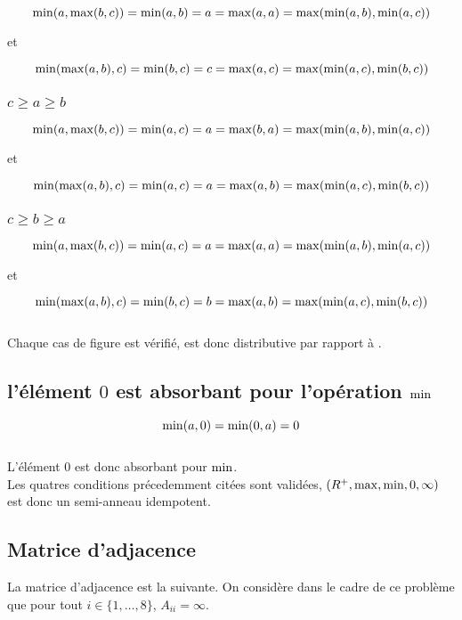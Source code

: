 \documentclass{article}
\begin{document}
$$\operatorname{min}(a, \operatorname{max}(b, c)) = \operatorname{min}(a, b) = a = \operatorname{max}(a,a) = \operatorname{max}(\operatorname{min}(a, b),\operatorname{min}(a,c))$$
\begin{center}et\end{center}
$$\operatorname{min}(\operatorname{max}(a,b),c) = \operatorname{min}(b,c) = c = \operatorname{max}(a,c) = \operatorname{max}(\operatorname{min}(a,c),\operatorname{min}(b,c))$$

\subsubsection{$c \geq a \geq b$}

$$\operatorname{min}(a, \operatorname{max}(b, c)) = \operatorname{min}(a,c) = a = \operatorname{max}(b,a) = \operatorname{max}(\operatorname{min}(a, b),\operatorname{min}(a,c))$$
\begin{center}et\end{center}
$$\operatorname{min}(\operatorname{max}(a,b),c) = \operatorname{min}(a,c) = a = \operatorname{max}(a,b) = \operatorname{max}(\operatorname{min}(a,c),\operatorname{min}(b,c))$$

\subsubsection{$c \geq b \geq a$}

$$\operatorname{min}(a, \operatorname{max}(b, c)) = \operatorname{min}(a,c) = a = \operatorname{max}(a,a) = \operatorname{max}(\operatorname{min}(a, b),\operatorname{min}(a,c))$$
\begin{center}et\end{center}
$$\operatorname{min}(\operatorname{max}(a,b),c) = \operatorname{min}(b,c) = b = \operatorname{max}(a,b) = \operatorname{max}(\operatorname{min}(a,c),\operatorname{min}(b,c))$$\\

Chaque cas de figure est vérifié, \mmin\; est donc distributive par rapport à \mmax.

\subsection{l'élément  $0$ est absorbant pour l'opération $\operatorname{min}$}

$$ \operatorname{min}(a,0) = \operatorname{min}(0,a) = 0$$\\

L'élément $0$ est donc absorbant pour $\operatorname{min}$.\\

Les quatres conditions précedemment citées sont validées, $(R^+,
\operatorname{max}, \operatorname{min}, 0, \infty)$ est donc un semi-anneau idempotent.

\subsection{Matrice d'adjacence}

La matrice d'adjacence est la suivante. On considère dans le cadre de
ce problème que pour tout $i \in \{1,\dots,8\}$, $A_{ii} = \infty$.\\
\end{document}
